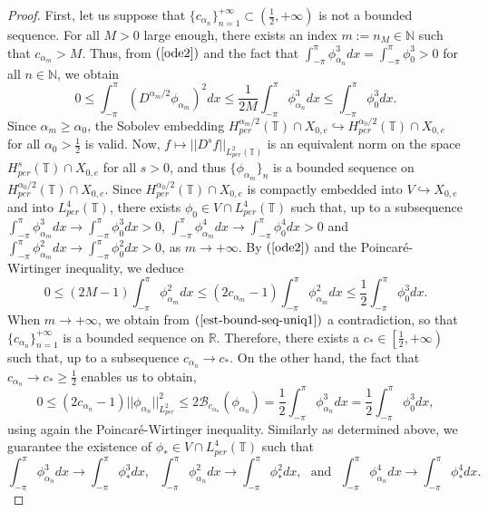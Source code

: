 \documentclass[12pt,reqno]{amsart}
\newcommand{\2}{L^2_{per}(0, T)}
\numberwithin{equation}{section}
\numberwithin{figure}{section}
\begin{document}
\begin{proof}
	First, let us suppose that $\{c_{\alpha_n}\}_{n=1}^{+\infty}\subset \left(\frac{1}{2},+\infty\right)$ is not a bounded sequence. For all $M>0$ large enough, there exists an index $m:=n_{M}\in\mathbb{N}$ such that $c_{\alpha_{m}}>M$. Thus, from $(\ref{ode2})$ and the fact that $\int_{-\pi}^{\pi}\phi_{\alpha_n}^3dx=\int_{-\pi}^{\pi}\phi_0^3>0$ for all $n\in\mathbb{N}$, we obtain
	$$
	 0\leq\int_{-\pi}^{\pi}(D^{\alpha_m/2}\phi_{\alpha_m})^2dx\leq\frac{1}{2M}\int_{-\pi}^{\pi}\phi_{\alpha_{n}}^3dx\leq\int_{-\pi}^{\pi}\phi_{0}^3dx.
$$
	\indent Since $\alpha_m\geq \alpha_0$, the Sobolev embedding $H_{per}^{\alpha_m/2}(\mathbb{T})\cap X_{0,e}\hookrightarrow H_{per}^{\alpha_0/2}(\mathbb{T})\cap X_{0,e}$ for all $\alpha_0>\frac{1}{2}$ is valid. Now,
	$f\mapsto ||D^{s}f||_{L_{per}^2(\mathbb{T})}$ is an equivalent norm on the space $H_{per}^{s}(\mathbb{T})\cap X_{0,e}$ for all $s>0$, and thus $\{\phi_{\alpha_m}\}_n$ is a bounded sequence on $H_{per}^{\alpha_0/2}(\mathbb{T})\cap X_{0,e}$. Since $H_{per}^{\alpha_0/2}(\mathbb{T})\cap X_{0,e}$ is compactly embedded into $V\hookrightarrow X_{0,e}$ and into $L_{per}^4(\mathbb{T})$, there exists $\phi_{0}\in V\cap L_{per}^4(\mathbb{T})$ such that, up to a subsequence $\int_{-\pi}^{\pi}\phi_{\alpha_m}^3dx\rightarrow\int_{-\pi}^{\pi}\phi_{0}^3dx>0$, $\int_{-\pi}^{\pi}\phi_{\alpha_m}^4dx\rightarrow\int_{-\pi}^{\pi}\phi_{0}^4dx>0$ and $\int_{-\pi}^{\pi}\phi_{\alpha_m}^2dx\rightarrow \int_{-\pi}^{\pi}\phi_{0}^2dx>0$, as $m\rightarrow+\infty$. By $(\ref{ode2})$ and the Poincar\'e-Wirtinger inequality, we deduce
	\begin{equation}\label{est-bound-seq-uniq1}
	0\leq(2M-1)\int_{-\pi}^{\pi}\phi_{\alpha_m}^2dx\leq (2c_{\alpha_m}-1)\int_{-\pi}^{\pi}\phi_{\alpha_m}^2dx\leq\frac{1}{2} \int_{-\pi}^{\pi}\phi_0^3dx.
	\end{equation}
	When $m\rightarrow+\infty$, we obtain from $(\ref{est-bound-seq-uniq1})$ a contradiction, so that $\{c_{\alpha_n}\}_{n=1}^{+\infty}$ is a bounded sequence on $\mathbb{R}$. Therefore, there exists a $c_{*}\in \left[\frac{1}{2},+\infty\right)$ such that, up to a subsequence
	$
	c_{\alpha_n}\rightarrow c_{*}.
$ On the other hand, the fact that $c_{\alpha_n}\rightarrow c_{*}\geq\frac{1}{2}$ enables us to obtain,
	$$0\leq (2c_{\alpha_n}-1)||\phi_{\alpha_n}||_{L_{per}^2}^2\leq 2\mathcal{B}_{c_{\alpha_{n}}}(\phi_{\alpha_{n}})=\frac{1}{2}\int_{-\pi}^{\pi}\phi_{\alpha_{n}}^3dx=\frac{1}{2}\int_{-\pi}^{\pi}\phi_{0}^3dx,$$
using again the Poincar\'e-Wirtinger inequality. Similarly as determined above, we guarantee the existence of $\phi_{*}\in V\cap L_{per}^4(\mathbb{T})$ such that
	\begin{equation}\label{conv1}
	\int_{-\pi}^{\pi}\phi_{\alpha_n}^3dx\rightarrow\int_{-\pi}^{\pi}\phi_{*}^3dx,\ \ \  \int_{-\pi}^{\pi}\phi_{\alpha_n}^2dx\rightarrow\int_{-\pi}^{\pi}\phi_{*}^2dx,\ \ \ \mbox{and}\ \ \
	 \int_{-\pi}^{\pi}\phi_{\alpha_n}^4dx\rightarrow \int_{-\pi}^{\pi}\phi_{*}^4dx.
	\end{equation}
	

\end{proof}
\end{document}

